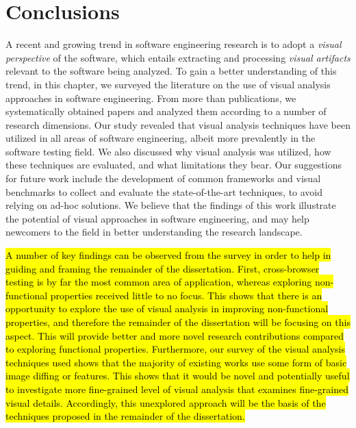 \section{Conclusions}\label{sec:conclusions}
A recent and growing trend in software engineering 
research is to adopt a \emph{visual perspective} of 
the software, which entails extracting and processing 
\textit{visual artifacts} relevant to the software being analyzed. 
To gain a better understanding of this trend,
in this chapter, we surveyed the literature on the use of 
visual analysis approaches in software engineering. 
From more than \initialPoolSize publications, 
we systematically obtained \numberOfPapers papers 
and analyzed them according to a number of research dimensions.
Our study revealed that visual analysis techniques 
have been utilized in all areas of software engineering, 
albeit more prevalently in the software testing field.
We also discussed why visual analysis was utilized, 
how these techniques are evaluated, and what limitations they bear.
Our suggestions for future work include the development 
of common frameworks and visual benchmarks to collect 
and evaluate the state-of-the-art techniques, 
to avoid relying on ad-hoc solutions. We believe that 
the findings of this work illustrate the potential of 
visual approaches in software engineering, and may help 
newcomers to the field in better understanding the research landscape.

\hl{A number of key findings can be observed from the survey in order to help in 
guiding and framing the remainder of the dissertation. 
First, cross-browser testing is by far the most common area of application, 
whereas exploring non-functional properties received little to no focus. 
This shows that there is an opportunity to explore the use of visual analysis 
in improving non-functional properties, and therefore the remainder of the dissertation 
will be focusing on this aspect. This will provide better and more novel research 
contributions compared to exploring functional properties. 
Furthermore, our survey of the visual analysis techniques used shows that the 
majority of existing works use some form of basic image diffing or features. This shows that it would be novel and potentially useful to investigate more fine-grained level of visual analysis that examines fine-grained visual details. Accordingly, this unexplored approach will be the basis of the techniques proposed in the remainder of the dissertation.}  


\balance
